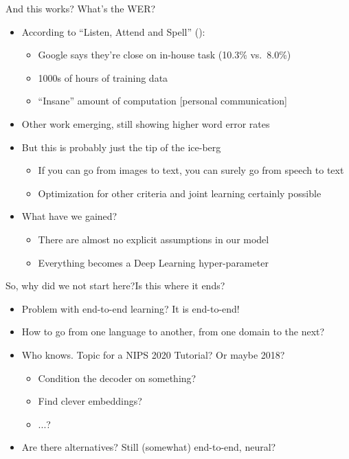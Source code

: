 \begin{frame}{And this works? What's the WER?}
  \begin{itemize}
  \item According to ``Listen, Attend and Spell'' (\cite{las}):
    \begin{itemize}
    \item Google says they're close on in-house task (10.3\% vs.\ 8.0\%)
    \item 1000s of hours of training data
    \item ``Insane'' amount of computation [personal communication]
    \end{itemize}
  \item Other work emerging, still showing higher word error rates
  \item But this is probably just the tip of the ice-berg
    \begin{itemize}
    \item If you can go from images to text, you can surely go from speech to text
      \item Optimization for other criteria and joint learning certainly possible
    \end{itemize}
  \item What have we gained?
    \begin{itemize}
    \item There are almost no explicit assumptions in our model
    \item Everything becomes a Deep Learning hyper-parameter
    \end{itemize}
  \end{itemize}
\end{frame}

\begin{frame}{So, why did we not start here?}{Is this where it ends?}
  \begin{itemize}
  \item Problem with end-to-end learning? It is end-to-end!
  \item How to go from one language to another, from one domain to the next?
  \item Who knows. Topic for a NIPS 2020 Tutorial? Or maybe 2018?
    \begin{itemize}
    \item Condition the decoder on something?
    \item Find clever embeddings?
    \item ...?
    \end{itemize}
  \item Are there alternatives? Still (somewhat) end-to-end, neural?
  \end{itemize}
\end{frame}

